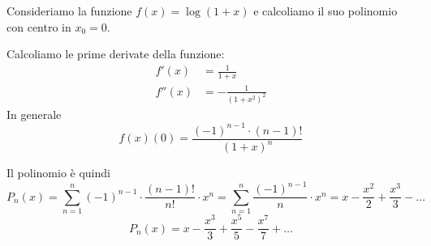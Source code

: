\begin{example}
Consideriamo la funzione $f(x) = \log (1+x)$ e calcoliamo il suo polinomio con centro in $x_0 = 0$.

Calcoliamo le prime derivate della funzione:
\begin{align*}
f'(x) &= \frac{1}{1+x} \\
f''(x) &= - \frac{1}{(1+x^2)^2}
\end{align*}
In generale
\begin{equation*}
f(x) (0) = \frac{(-1)^{n-1} \cdot (n-1)!}{(1+x)^n}
\end{equation*}

Il polinomio è quindi
\begin{equation*}
P_n(x) = \sum_{n=1}^n (-1)^{n-1} \cdot \frac{(n-1)!}{n!} \cdot x^n = \sum_{n=1}^n \frac{(-1)^{n-1}}{n} \cdot x^n = x - \frac{x^2}{2} + \frac{x^3}{3} - \ldots
\end{equation*}
\begin{equation*}
P_n(x) = x - \frac{x^3}{3} + \frac{x^5}{5} - \frac{x^7}{7} + \ldots
\end{equation*}
\end{example}